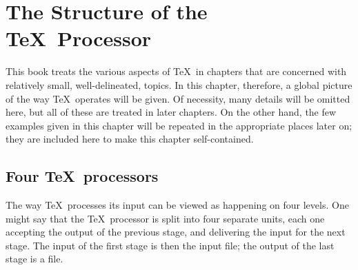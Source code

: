 \documentclass[letterpaper]{book}
\begin{document}
\chapter{The Structure of the \TeX\ Processor}

This book treats the various aspects of \TeX\ in chapters
that are concerned with relatively small, well-delineated,
topics. In this chapter, therefore, 
a global picture of the way \TeX\ operates will be given.
Of necessity, many details will be omitted here, but all of
these are treated in later chapters. On the other hand,
the few examples given in this chapter will be repeated
in the appropriate places later on; they are included here
to make this chapter self-contained.

\section{Four \TeX\protect\ processors}

The way \TeX\ processes its input can be viewed as
happening on four levels. One might  say that
the \TeX\ processor is split into four separate units,
each one accepting the output of the previous stage, and
delivering the input for the next stage. The input of
the first stage is then the  input file; the output
of the last stage is a  file.
\end{document}
